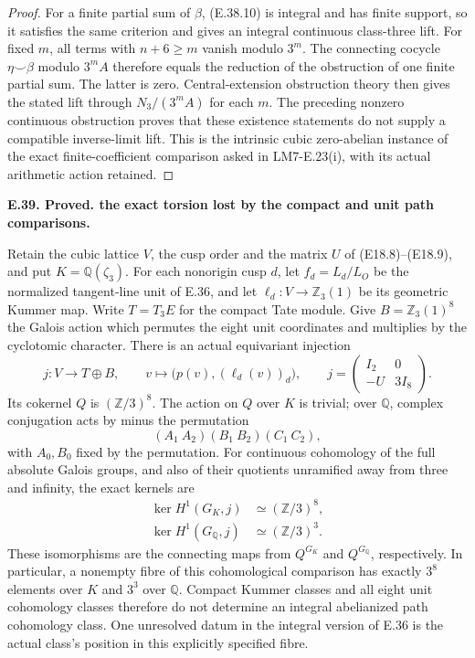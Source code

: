 \documentclass[11pt,oneside]{article}
\makeatletter
\newcounter{statementanchor}
\newenvironment{statement}[3]{%
 \refstepcounter{statementanchor}\def\@currentlabel{#1}%
 \par\addvspace{9pt}\noindent
 \textbf{#1. #2. #3.}\par\nobreak\noindent\ignorespaces
}{\par\addvspace{5pt}}
\makeatother
\begin{document}
\begin{proof}
For a finite partial sum of $\beta$,
(E.38.10) is integral and has finite
support, so it satisfies the same
criterion and gives an integral
continuous class-three lift. For
fixed $m$, all terms with $n+6\ge m$
vanish modulo $3^m$. The connecting
cocycle $\eta\smile\beta$ modulo
$3^mA$ therefore equals the reduction
of the obstruction of one finite
partial sum. The latter is zero.
Central-extension obstruction theory
then gives the stated lift through
$N_3/(3^mA)$ for each $m$.
The preceding nonzero continuous
obstruction proves that these
existence statements do not supply
a compatible inverse-limit lift.
This is the intrinsic cubic
zero-abelian instance of the exact
finite-coefficient comparison asked
in LM7-E.23(i), with its actual
arithmetic action retained.
\end{proof}

\begin{statement}{E.39}{Proved}{the exact torsion lost by the compact and unit path comparisons}
\label{st:E.39}
\label{E-integral-path-comparison}
Retain the cubic lattice $V$, the cusp order and the matrix $U$
of (E18.8)--(E18.9), and put $K=\mathbb Q(\zeta_3)$.
For each nonorigin cusp $d$, let $f_d=L_d/L_O$ be the
normalized tangent-line unit of E.36, and let
$\ell_d:V\to\mathbb Z_3(1)$ be its geometric Kummer map.
Write $T=T_3E$ for the compact Tate module. Give
$B=\mathbb Z_3(1)^8$ the Galois action which permutes the
eight unit coordinates and multiplies by the cyclotomic
character. There is an actual equivariant injection
\[
 j:V\longrightarrow T\oplus B,\qquad
 v\longmapsto\bigl(p(v),(\ell_d(v))_d\bigr),\qquad
 j=\begin{pmatrix}I_2&0\\-U&3I_8\end{pmatrix}.
 \tag{E.39.1}
\]
Its cokernel $Q$ is $(\mathbb Z/3)^8$. The action on $Q$
over $K$ is trivial; over $\mathbb Q$, complex conjugation
acts by minus the permutation
\[
 (A_1\ A_2)(B_1\ B_2)(C_1\ C_2),
 \tag{E.39.2}
\]
with $A_0,B_0$ fixed by the permutation.
For continuous cohomology of the full absolute Galois
groups, and also of their quotients unramified away from
three and infinity, the exact kernels are
\[
 \begin{aligned}
 \ker H^1(G_K,j)&\simeq(\mathbb Z/3)^8,\\
 \ker H^1(G_{\mathbb Q},j)&\simeq(\mathbb Z/3)^3.
 \end{aligned}
 \tag{E.39.3}
\]
These isomorphisms are the connecting maps from $Q^{G_K}$
and $Q^{G_{\mathbb Q}}$, respectively. In particular, a
nonempty fibre of this cohomological comparison has
exactly $3^8$ elements over $K$ and $3^3$ over
$\mathbb Q$. Compact Kummer classes and all eight unit
cohomology classes therefore do not determine an integral
abelianized path cohomology class. One unresolved datum
in the integral version of E.36 is the actual class's
position in this explicitly specified fibre.
\end{statement}
\end{document}
